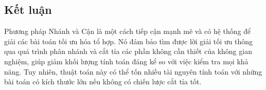 \subsection{Kết luận}

Phương pháp Nhánh và Cận là một cách tiếp cận mạnh mẽ và có hệ thống để giải các bài toán tối ưu hóa tổ hợp. Nó đảm bảo tìm được lời giải tối ưu thông qua quá trình phân nhánh và cắt tỉa các phần không cần thiết của không gian nghiệm, giúp giảm khối lượng tính toán đáng kể so với việc kiểm tra mọi khả năng. Tuy nhiên, thuật toán này có thể tốn nhiều tài nguyên tính toán với những bài toán có kích thước lớn nếu không có chiến lược cắt tỉa tốt.
